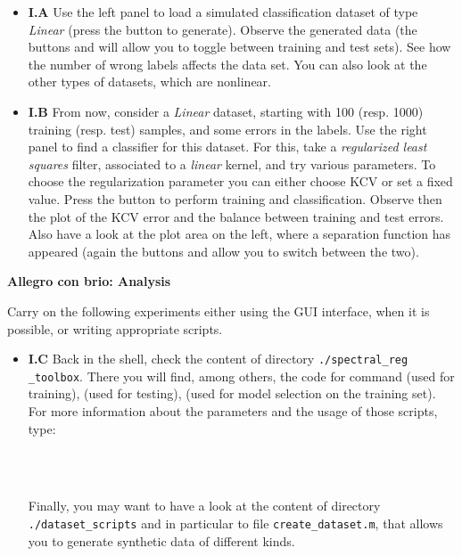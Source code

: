 \documentclass[DIN, pagenumber=false, fontsize=11pt, parskip=half]{scrartcl}
\newcommand{\mysection}[1]{\noindent\large\textbf{#1}}
\begin{document}
\begin{itemize}
	\item \textbf{I.A} Use the left panel to load  a simulated classification dataset of type \textit{Linear} (press the button  to generate).
	Observe the generated data (the buttons  and  will allow you to toggle between training and test sets).
	See how the number of wrong labels affects the data set.
	You can also look at the other types of datasets, which are nonlinear.
	\item \textbf{I.B} From now, consider a \textit{Linear} dataset, starting with 100 (resp. 1000) training (resp. test) samples, and some errors in the labels. 
	Use the right panel to find a  classifier for this dataset.
	For this, take a \textit{regularized least squares} filter, associated to a \textit{linear} kernel, and try various parameters.
	To choose the regularization parameter you can either choose KCV or set a fixed value.
	Press the button  to perform training and classification.
	Observe then the plot of the KCV error and the balance between training and test errors.
	Also have a look at the plot area on the left, where a separation function has appeared (again the buttons  and  allow you to switch between the two).
\end{itemize}








\mysection{Allegro con brio: Analysis}

Carry on the following experiments either using the GUI interface, when it is possible, or writing appropriate scripts.

\begin{itemize}
	\item \textbf{I.C} Back in the shell, check the content of directory \texttt{./spectral\_reg} \texttt{\_toolbox}. 
	There you will find, among others, the code for command  (used for training),  (used for testing),  (used for model selection on the training set).
For more information about the parameters and the usage of those scripts, type:

\\
\\


Finally, you may want to have a look at the content of directory \texttt{./dataset\_scripts} and in particular to file \texttt{create\_dataset.m}, that  allows you to generate synthetic data of different kinds.
\end{itemize}
\end{document}
